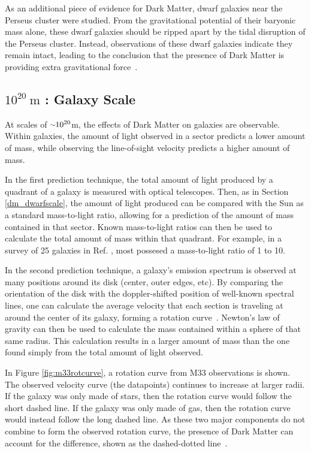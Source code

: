     As an additional piece of evidence for Dark Matter, dwarf galaxies near the Perseus cluster were studied.
    From the gravitational potential of their baryonic mass alone, these dwarf galaxies should be ripped apart by the tidal disruption of the Perseus cluster.
    Instead, observations of these dwarf galaxies indicate they remain intact, leading to the conclusion that the presence of Dark Matter is providing extra gravitational force~\cite{Penny2009}.
    
    \FloatBarrier

  \subsection{$10^{20}\:\text{m}$ : Galaxy Scale}
    At scales of $\nicetilde 10^{20}$m, the effects of Dark Matter on galaxies are observable.
    Within galaxies, the amount of light observed in a sector predicts a lower amount of mass, while observing the line-of-sight velocity predicts a higher amount of mass.
    
    In the first prediction technique, the total amount of light produced by a quadrant of a galaxy is measured with optical telescopes.
    Then, as in Section \ref{dm_dwarfscale}, the amount of light produced can be compared with the Sun as a standard mass-to-light ratio, allowing for a prediction of the amount of mass contained in that sector.
    Known mass-to-light ratios can then be used to calculate the total amount of mass within that quadrant.
    For example, in a survey of 25 galaxies in Ref. \cite{galaxy_mass_light_ratio}, most possesed a mass-to-light ratio of 1 to 10.

    In the second prediction technique, a galaxy's emission spectrum is observed at many positions around its disk (center, outer edges, etc).
    By comparing the orientation of the disk with the doppler-shifted position of well-known spectral lines, one can calculate the average velocity that each section is traveling at around the center of its galaxy, forming a rotation curve~\cite{rotation_curve_review,spiral_galaxy_rot_curve,milkyway_dm_evidence}.
    Newton's law of gravity can then be used to calculate the mass contained within a sphere of that same radius.
    This calculation results in a larger amount of mass than the one found simply from the total amount of light observed.
    
    In Figure \ref{fig:m33rotcurve}, a rotation curve from M33 observations is shown.
    The observed velocity curve (the datapoints) continues to increase at larger radii.
    If the galaxy was only made of stars, then the rotation curve would follow the short dashed line.
    If the galaxy was only made of gas, then the rotation curve would instead follow the long dashed line.
    As these two major components do not combine to form the observed rotation curve, the presence of Dark Matter can account for the difference, shown as the dashed-dotted line~\cite{m33rotcurve}.
    

